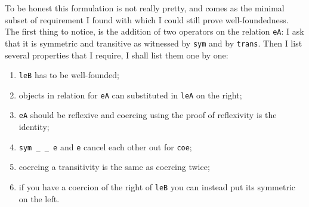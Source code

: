To be honest this formulation is not really pretty, and comes as the minimal
subset of requirement I found with which I could still prove well-foundedness.
The first thing to notice, is the addition of two operators on the relation
\texttt{eA}: I ask that it is symmetric and transitive as witnessed
by \texttt{sym} and by \texttt{trans}.
Then I list several properties that I require, I shall list them one by one:
\begin{enumerate}[label=(\roman*)]
  \item \texttt{leB} has to be well-founded;
  \item objects in relation for \texttt{eA} can substituted in
  \texttt{leA} on the right;
  \item \texttt{eA} should be reflexive and coercing using the proof
  of reflexivity is the identity;
  \item \texttt{sym _ _ e} and \texttt{e} cancel each other
  out for \texttt{coe};
  \item coercing a transitivity is the same as coercing twice;
  \item if you have a coercion of the right of \texttt{leB} you can
  instead put its symmetric on the left.
\end{enumerate}